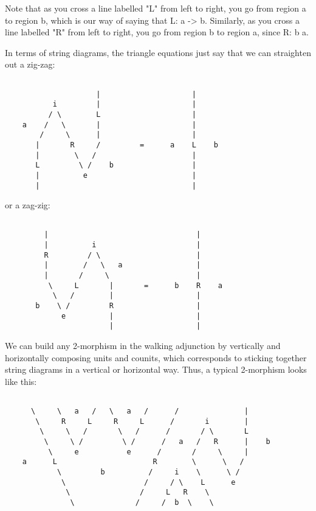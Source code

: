 Note that as you cross a line labelled "L" from left to right,
you go from region a to region b, which is our way of saying that L: a
-> b.  Similarly, as you cross a line labelled "R" from
left to right, you go from region b to region a, since R: b \to  a.

In terms of string diagrams, the triangle equations just say that we can
straighten out a zig-zag:


\begin{verbatim}

                     |                     |  
           i         |                     |
          / \        L                     |
    a    /   \       |                     |
        /     \      |                     |
       |       R     /         =      a    L    b
       |        \   /                      | 
       L         \ /    b                  |
       |          e                        |
       |                                   |  
\end{verbatim}
    
or a zag-zig:
 

\begin{verbatim}

         |                                  |   
         |          i                       |
         R         / \                      |
         |        /   \   a                 |
         |       /     \                    |
          \     L       |       =      b    R    a          
           \   /        |                   |
       b    \ /         R                   |
             e          |                   |
                        |                   |
\end{verbatim}
    
We can build any 2-morphism in the walking adjunction by vertically
and horizontally composing units and counits, which corresponds to
sticking together string diagrams in a vertical or horizontal way.
Thus, a typical 2-morphism looks like this:


\begin{verbatim}

      \     \   a   /   \   a   /      /               |
       \     R     L     R     L      /       i        |
        \     \   /       \   /      /       / \       L
         \     \ /         \ /      /   a   /   R      |    b
          \     e           e      /       /     \     |
    a      L                      R        \      \   / 
            \         b          /     i    \      \ / 
             \                  /     / \    L      e
              \                /     L   R    \       
               \              /     /  b  \    \  

\end{verbatim}
    
